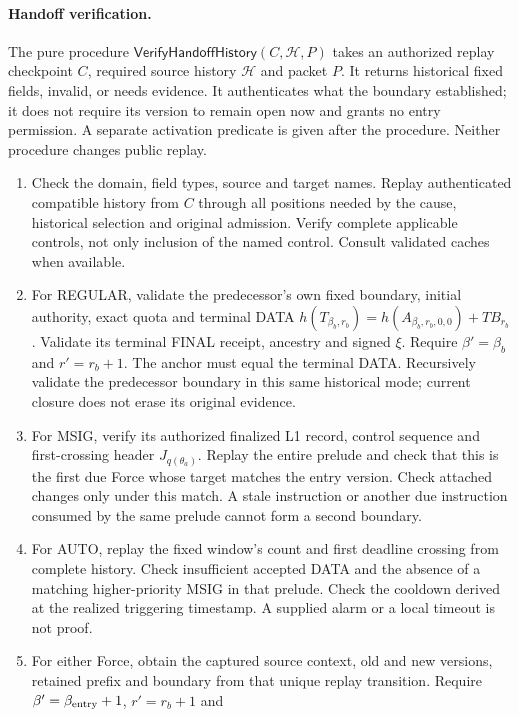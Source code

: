 \documentclass[11pt,a4paper]{article}
\newcommand{\TB}{\mathit{TB}}
\newcommand{\tagg}[1]{\ensuremath{\mathsf{#1}}}
\begin{document}
\paragraph{Handoff verification.}
\label{sec:verify-handoff}
The pure procedure $\tagg{VerifyHandoffHistory}(C,\mathcal H,P)$ takes an
authorized replay checkpoint $C$, required source history $\mathcal H$
and packet $P$. It returns historical fixed fields, invalid, or needs
evidence. It authenticates what the boundary established; it does not
require its version to remain open now and grants no entry permission.
A separate activation predicate is given after the procedure. Neither
procedure changes public replay.
\begin{enumerate}[label=(\roman*),itemsep=2pt]
\item Check the domain, field types, source and target names. Replay
authenticated compatible history from $C$ through all positions
needed by the cause, historical selection and original admission.
Verify complete applicable controls, not only inclusion of the named
control. Consult validated caches when available.
\item For REGULAR, validate the predecessor's own fixed boundary,
initial authority, exact quota and terminal DATA
$h(T_{\beta_b,r_b})=h(A_{\beta_b,r_b,0,0})+\TB_{r_b}$.
Validate its terminal FINAL receipt, ancestry and signed $\xi$.
Require $\beta'=\beta_b$ and $r'=r_b+1$. The anchor must equal the
terminal DATA. Recursively validate the predecessor boundary in this same
historical mode; current closure does not erase its original evidence.
\item For MSIG, verify its authorized finalized L1 record, control
sequence and first-crossing header $J_{q(\theta_a)}$. Replay the
entire prelude and check that this is the first due Force whose target
matches the entry version. Check attached changes only under this
match. A stale instruction or another due instruction consumed by the
same prelude cannot form a second boundary.
\item For AUTO, replay the fixed window's count and first deadline
crossing from complete history. Check insufficient accepted DATA and
the absence of a matching higher-priority MSIG in that prelude.
Check the cooldown derived at the realized triggering timestamp.
A supplied alarm or a local timeout is not proof.
\item For either Force, obtain the captured source context, old and
new versions, retained prefix and boundary from that unique replay
transition. Require $\beta'=\beta_{\rm entry}+1$, $r'=r_b+1$ and

\end{enumerate}
\end{document}
